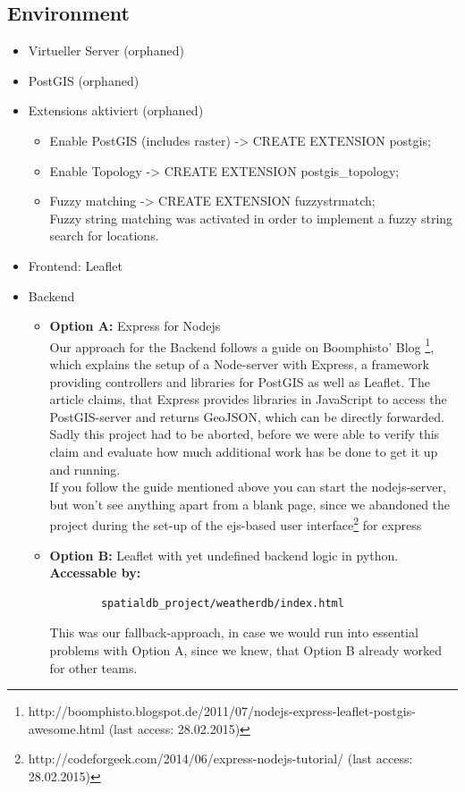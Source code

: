 \documentclass[paper=a4, fontsize=11pt]{article} %
\numberwithin{equation}{section} %
\numberwithin{figure}{section} %
\numberwithin{table}{section} %
\begin{document}
\subsection{Environment}
\begin{itemize}
	\item Virtueller Server (orphaned)
    \item PostGIS (orphaned)
    \item Extensions aktiviert (orphaned)
    \begin{itemize}
    	\item Enable PostGIS (includes raster) -> CREATE EXTENSION postgis;
   		\item Enable Topology -> CREATE EXTENSION postgis\_topology;
    	\item Fuzzy matching -> CREATE EXTENSION fuzzystrmatch;\\
    	Fuzzy string matching was activated in order to implement a fuzzy string search for locations.
    \end{itemize}
    \item Frontend: Leaflet
    \item Backend
     \begin{itemize}
    	\item \textbf{Option A:} Express for Nodejs\\ [0.1cm]
    	Our approach for the Backend follows a guide on Boomphisto' Blog
    	\footnote{http://boomphisto.blogspot.de/2011/07/nodejs-express-leaflet-postgis-awesome.html (last access: 28.02.2015)}, which explains the setup of a Node-server with Express, a framework providing controllers and libraries for PostGIS as well as Leaflet.
    	The article claims, that Express provides libraries in JavaScript to access the PostGIS-server and returns GeoJSON, which can be directly forwarded.\\ Sadly this project had to be aborted, before we were able to verify this claim and evaluate how much additional work has be done to get it up and running.\\
    	If you follow the guide mentioned above you can start the nodejs-server, but won't see anything apart from a blank page, since we abandoned the project during the set-up of the ejs-based user interface\footnote{http://codeforgeek.com/2014/06/express-nodejs-tutorial/ (last access: 28.02.2015)} for express 
   		\item \textbf{Option B:} Leaflet with yet undefined backend logic in python.\\ [0.1cm]
   		\textbf {Accessable by:}
   		\begin{lstlisting}
   		spatialdb_project/weatherdb/index.html
   		\end{lstlisting}
   		This was our fallback-approach, in case we would run into essential problems with Option A, since we knew, that Option B already worked for other teams.
    \end{itemize}
\end{itemize}
\end{document}
